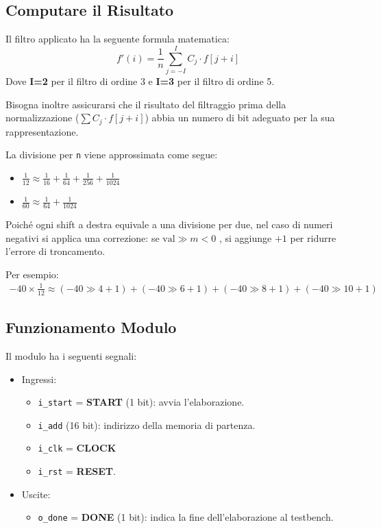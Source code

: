 \documentclass{article}
\begin{document}
\subsection{Computare il Risultato}

Il filtro applicato ha la seguente formula matematica:
$$
f'(i) = \frac{1}{n} \sum_{j=-I}^{I} C_j \cdot f[j+i]
$$
Dove \textbf{I=2} per il filtro di ordine 3 e \textbf{I=3} per il filtro di ordine 5.

\noindent Bisogna inoltre assicurarsi che il risultato del filtraggio prima della normalizzazione ($\sum C_j \cdot f[j+i]$) abbia un numero di bit adeguato per la sua rappresentazione.

\noindent La divisione per \texttt{n} viene approssimata come segue:
\begin{itemize}
    \item $\frac{1}{12} \approx \frac{1}{16} + \frac{1}{64} + \frac{1}{256} + \frac{1}{1024}$
    \item $\frac{1}{60} \approx \frac{1}{64} + \frac{1}{1024}$
\end{itemize}

Poiché ogni shift a destra equivale a una divisione per due, nel caso di numeri negativi si applica
una correzione: se $\text{val} \gg m < 0$ , si aggiunge $+1$ per ridurre l'errore di troncamento.

Per esempio:
\begin{gather*}
-40 \times \frac{1}{12} \approx (-40 \gg 4 + 1) + (-40 \gg 6 + 1) + (-40 \gg 8 + 1) + (-40 \gg 10 + 1)
\end{gather*}

\subsection{Funzionamento Modulo}

Il modulo ha i seguenti segnali:
\begin{itemize}
    \item Ingressi:
    \begin{itemize}
        \item \texttt{i\_start} = \textbf{START} (1 bit): avvia l'elaborazione.
        \item \texttt{i\_add} (16 bit): indirizzo della memoria di partenza.
        \item \texttt{i\_clk} = \textbf{CLOCK}
        \item \texttt{i\_rst} = \textbf{RESET}.
    \end{itemize}
    \item Uscite:
    \begin{itemize}
        \item \texttt{o\_done} = \textbf{DONE} (1 bit): indica la fine dell'elaborazione al testbench.
    \end{itemize}
\end{itemize}
\end{document}
